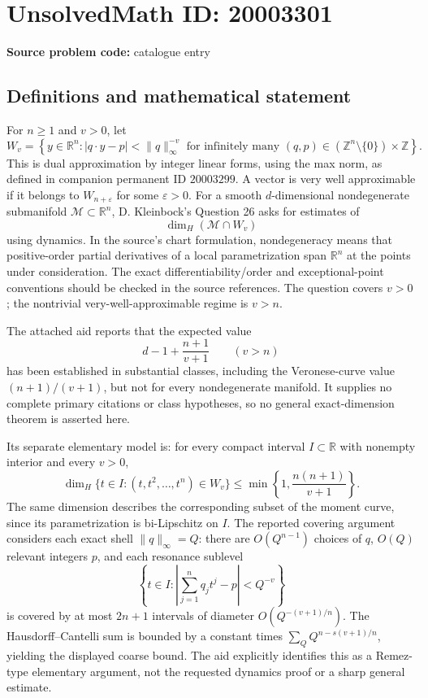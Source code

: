 \documentclass[11pt]{article}
\newcommand{\Z}{\mathbb{Z}}
\newcommand{\R}{\mathbb{R}}
\begin{document}
\section*{UnsolvedMath ID: 20003301}
\textbf{Source problem code:} catalogue entry
\subsection{Definitions and mathematical statement}
For $n\ge1$ and $v>0$, let
\[
 W_v=\left\{y\in\R^n:|q\cdot y-p|<\|q\|_\infty^{-v}
 \text{ for infinitely many }(q,p)\in(\Z^n\setminus\{0\})\times\Z\right\}.
\]
This is dual approximation by integer linear forms, using the max norm, as defined in companion permanent ID $20003299$. A vector is very well approximable if it belongs to $W_{n+\varepsilon}$ for some $\varepsilon>0$. For a smooth $d$-dimensional nondegenerate submanifold $\mathcal M\subset\R^n$, D. Kleinbock's Question 26 asks for estimates of
\[
 \dim_H(\mathcal M\cap W_v)
\]
using dynamics. In the source's chart formulation, nondegeneracy means that positive-order partial derivatives of a local parametrization span $\R^n$ at the points under consideration. The exact differentiability/order and exceptional-point conventions should be checked in the source references. The question covers $v>0$; the nontrivial very-well-approximable regime is $v>n$.

The attached aid reports that the expected value
\[
 d-1+\frac{n+1}{v+1}\qquad(v>n)
\]
has been established in substantial classes, including the Veronese-curve value $(n+1)/(v+1)$, but not for every nondegenerate manifold. It supplies no complete primary citations or class hypotheses, so no general exact-dimension theorem is asserted here.

Its separate elementary model is: for every compact interval $I\subset\R$ with nonempty interior and every $v>0$,
\[
 \dim_H\{t\in I:(t,t^2,\ldots,t^n)\in W_v\}
 \le\min\left\{1,\frac{n(n+1)}{v+1}\right\}.
\]
The same dimension describes the corresponding subset of the moment curve, since its parametrization is bi-Lipschitz on $I$. The reported covering argument considers each exact shell $\|q\|_\infty=Q$: there are $O(Q^{n-1})$ choices of $q$, $O(Q)$ relevant integers $p$, and each resonance sublevel
\[
 \left\{t\in I:\left|\sum_{j=1}^nq_jt^j-p\right|<Q^{-v}\right\}
\]
is covered by at most $2n+1$ intervals of diameter $O(Q^{-(v+1)/n})$. The Hausdorff--Cantelli sum is bounded by a constant times $\sum_Q Q^{n-s(v+1)/n}$, yielding the displayed coarse bound. The aid explicitly identifies this as a Remez-type elementary argument, not the requested dynamics proof or a sharp general estimate.
\end{document}
